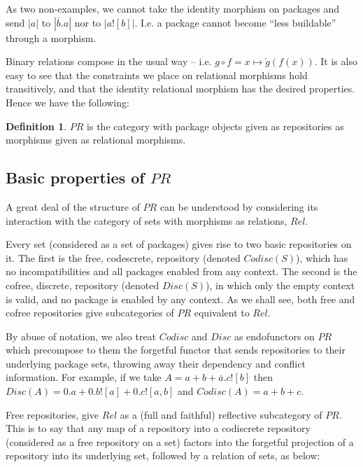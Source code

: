 \documentclass[hoptionsi,review,screen,format=sigconf]{acmart}
\theoremstyle{definition}
\newtheorem{definition}{Definition}[section]
\newcommand{\PRb}{\mathit{PR}}
\newcommand{\Relb}{\mathit{Rel}}
\begin{document}
As two non-examples, we cannot take the identity morphism on packages and send \(|a|\) to \(|\overline{b}.a|\) nor to \(|a![b]|\). I.e. a package cannot become ``less buildable'' through a morphism.


Binary relations compose in the usual way -- i.e. \(g \circ f = x \mapsto \check{g}(f(x))\). It is also easy to see that the constraints we place on relational morphisms hold transitively, and that the identity relational morphism has the desired properties. Hence we have the following:

\begin{definition}
\(\PRb\) is the category with package objects given as repositories as morphisms given as relational morphisms.
\end{definition}

\subsection{Basic properties of \(\PRb\)}


A great deal of the structure of \(\PRb\) can be understood by considering its interaction with the category of sets with morphisms as relations, \(\Relb\). 

Every set (considered as a set of packages) gives rise to two basic repositories on it. The first is the free, codescrete, repository (denoted \(Codisc(S)\)), which has no incompatibilities and all packages enabled from any context. The second is the cofree, discrete, repository (denoted \(Disc(S)\)), in which only the empty context is valid, and no package is enabled by any context. As we shall see, both free and cofree repositories give subcategories of \(\PRb\) equivalent to \(\Relb\).

By abuse of notation, we also treat \(Codisc\) and \(Disc\) as endofunctors on \(\PRb\) which precompose to them the forgetful functor that sends repositories to their underlying package sets, throwing away their dependency and conflict information. For example, if we take \(A = a + b + \overline{a}.c![b]\) then \(Disc(A) = 0.a + 0.b![a] + 0.c![a,b]\) and \(Codisc(A) = a + b + c\). 

Free repositories, give \(\Relb\) as a (full and faithful) reflective subcategory of \(\PRb\). This is to say that any map of a repository into a codiscrete repository (considered as a free repository on a set) factors into the forgetful projection of a repository into its underlying set, followed by a relation of sets, as below:
\end{document}
